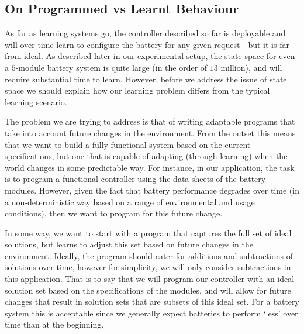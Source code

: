 \subsection{On Programmed vs Learnt Behaviour}\label{subsec:constraints}

As far as learning systems go, the controller described so far is deployable and will over time learn to configure the battery for any given request - but it is far from ideal. As described later in our experimental setup, the state space for even a $5$-module battery system is quite large (in the order of $13$ million), and will require substantial time to learn. However, before we address the issue of state space we should explain how our learning problem differs from the typical learning scenario.

The problem we are trying to address is that of writing adaptable programs that take into account future changes in the environment. From the outset this means that we want to build a fully functional system based on the current specifications, but one that is capable of adapting (through learning) when the world changes in some predictable way. For instance, in our application, the task is to program a functional controller using the data sheets of the battery modules. However, given the fact that battery performance degrades over time (in a non-deterministic way based on a range of environmental and usage conditions), then we want to program for this future change. 

In some way, we want to start with a program that captures the full set of ideal solutions, but learns to adjust this set based on future changes in the environment. Ideally, the program should cater for additions and subtractions of solutions over time, however for simplicity, we will only consider subtractions in this application. That is to say that we will program our controller with an ideal solution set based on the specifications of the modules, and will allow for future changes that result in solution sets that are subsets of this ideal set. For a battery system this is acceptable since we generally expect batteries to perform `less' over time than at the beginning.

